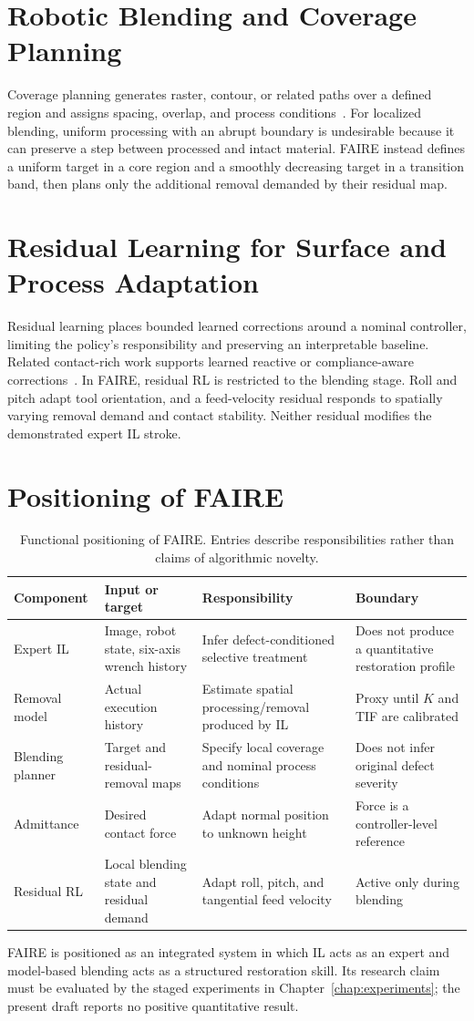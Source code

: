 \section{Robotic Blending and Coverage Planning}
Coverage planning generates raster, contour, or related paths over a defined region and assigns spacing, overlap, and process conditions~\cite{schneyer2023segmentation,mcgovern2024coverage}. For localized blending, uniform processing with an abrupt boundary is undesirable because it can preserve a step between processed and intact material. FAIRE instead defines a uniform target in a core region and a smoothly decreasing target in a transition band, then plans only the additional removal demanded by their residual map.

\section{Residual Learning for Surface and Process Adaptation}
Residual learning places bounded learned corrections around a nominal controller, limiting the policy's responsibility and preserving an interpretable baseline. Related contact-rich work supports learned reactive or compliance-aware corrections~\cite{hou2025adaptivecompliance,xue2025reactivediffusion}. In FAIRE, residual RL is restricted to the blending stage. Roll and pitch adapt tool orientation, and a feed-velocity residual responds to spatially varying removal demand and contact stability. Neither residual modifies the demonstrated expert IL stroke.

\section{Positioning of FAIRE}
\begin{table}[t]
\centering
\caption{Functional positioning of FAIRE. Entries describe responsibilities rather than claims of algorithmic novelty.}
\label{tab:related_positioning}
\small
\begin{tabularx}{\textwidth}{p{}XXX}
\toprule
Component & Input or target & Responsibility & Boundary \\
\midrule
Expert IL & Image, robot state, six-axis wrench history & Infer defect-conditioned selective treatment & Does not produce a quantitative restoration profile \\
Removal model & Actual execution history & Estimate spatial processing/removal produced by IL & Proxy until \(K\) and TIF are calibrated \\
Blending planner & Target and residual-removal maps & Specify local coverage and nominal process conditions & Does not infer original defect severity \\
Admittance & Desired contact force & Adapt normal position to unknown height & Force is a controller-level reference \\
Residual RL & Local blending state and residual demand & Adapt roll, pitch, and tangential feed velocity & Active only during blending \\
\bottomrule
\end{tabularx}
\end{table}

FAIRE is positioned as an integrated system in which IL acts as an expert and model-based blending acts as a structured restoration skill. Its research claim must be evaluated by the staged experiments in Chapter~\ref{chap:experiments}; the present draft reports no positive quantitative result.
